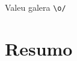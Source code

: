 \documentclass[11pt,twoside,a4paper]{book}
\newcommand\Leo[1]{\nb{Leo}{#1}}
\begin{document}
Valeu galera \verb!\o/!


\chapter*{Resumo}


\end{document}
